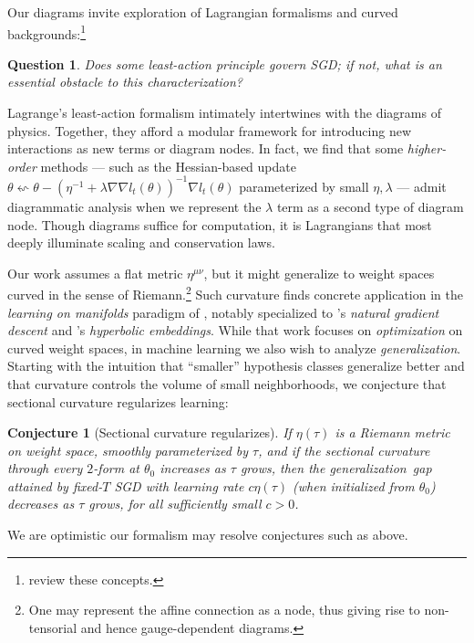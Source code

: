 \documentclass[openany, notitlepage, justified]{tufte-book}
\theoremstyle{plain}
\newtheorem{conj}{Conjecture}
\newtheorem{quest}{Question}
\theoremstyle{definition}
\begin{document}
        Our diagrams invite exploration of Lagrangian formalisms and curved
        backgrounds:\footnote{
            \citep{la60, la51} review these concepts.
        }
        \begin{quest}
            Does some least-action principle govern SGD; if not, what is an
            essential obstacle to this characterization?
        \end{quest}
        Lagrange's least-action formalism intimately intertwines with the
        diagrams of physics.  Together, they afford a modular framework for
        introducing new interactions as new terms or diagram nodes.  In fact,
        we find that some \emph{higher-order} methods --- such as the
        Hessian-based update
        $
            \theta \leftsquigarrow
            \theta -
            (\eta^{-1} + \lambda \nabla \nabla l_t(\theta))^{-1}
            \nabla l_t(\theta)
        $
        parameterized by small $\eta, \lambda$ --- admit diagrammatic analysis
        when we represent the $\lambda$ term as a second type of diagram node.
        Though diagrams suffice for computation, it is Lagrangians that most
        deeply illuminate scaling and conservation laws.

        Our work assumes a flat metric $\eta^{\mu\nu}$, but it might
        generalize to weight spaces curved in the sense of Riemann.\footnote{
            One may represent the affine connection as a node, thus giving
            rise to non-tensorial and hence gauge-dependent diagrams.
        }  Such curvature finds concrete application in the \emph{learning on
        manifolds} paradigm of \citep{ab07, zh16}, notably specialized to
        \citep{am98}'s \emph{natural gradient descent} and \citep{ni17}'s
        \emph{hyperbolic embeddings}.  While that work focuses on
        \emph{optimization} on curved weight spaces, in machine learning we
        also wish to analyze \emph{generalization}.
        Starting with the intuition that ``smaller'' hypothesis classes
        generalize better and that curvature controls the volume of small
        neighborhoods, we conjecture that sectional curvature regularizes
        learning:
        \begin{conj}[Sectional curvature regularizes]
            If $\eta(\tau)$ is a Riemann metric on weight space, smoothly
            parameterized by $\tau$, and if the sectional curvature through
            every $2$-form at $\theta_0$ increases as $\tau$ grows, then
            the generalization\ gap attained by fixed-$T$ SGD with learning rate $c
            \eta(\tau)$ (when initialized from $\theta_0$) decreases as $\tau$
            grows, for all sufficiently small $c>0$.
        \end{conj}
        We are optimistic our formalism may resolve conjectures such as above.
\end{document}
